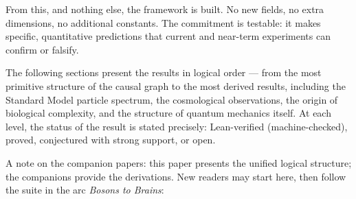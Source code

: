 \documentclass[11pt,a4paper]{article}
\begin{document}
From this, and nothing else, the framework is built. No new fields, no extra
dimensions, no additional constants. The commitment is testable: it makes
specific, quantitative predictions that current and near-term experiments can
confirm or falsify.

The following sections present the results in logical order --- from the most
primitive structure of the causal graph to the most derived results, including
the Standard Model particle spectrum, the cosmological observations, the origin
of biological complexity, and the structure of quantum mechanics itself.
At each level, the status of the result is stated precisely: Lean-verified
(machine-checked), proved, conjectured with strong support, or open.

A note on the companion papers: this paper presents the unified logical
structure; the companions provide the derivations. New readers may start
here, then follow the suite in the arc \emph{Bosons to Brains}:
\end{document}
